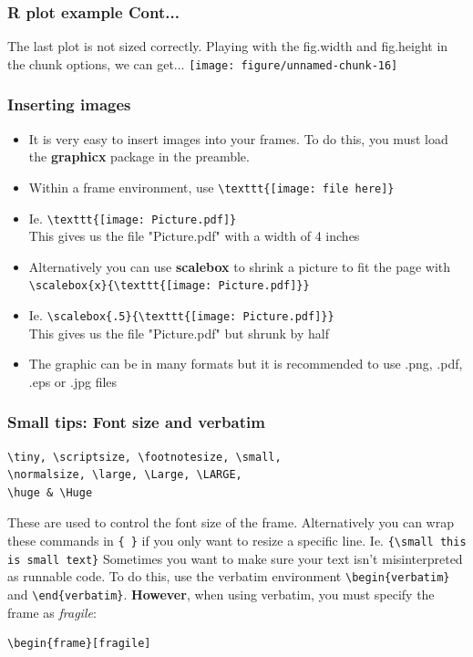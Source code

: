 \documentclass[nogin]{beamer}\usepackage[]{graphicx}\usepackage[]{color}
\newenvironment{knitrout}{}{} %
\begin{document}
\begin{frame}
\frametitle{R plot example Cont...}
The last plot is not sized correctly. Playing with the fig.width and fig.height in the chunk options, we can get...
\begin{knitrout}
\color{fgcolor}
\texttt{[image: figure/unnamed-chunk-16]} 

\end{knitrout}

\end{frame}

\begin{frame}[fragile]
\frametitle{Inserting images}
\scriptsize
\begin{itemize}
\item It is very easy to insert images into your frames. To do this, you must load the \textbf{graphicx} package in the preamble.
\item Within a frame environment, use \verb|\texttt{[image: file here]}|
\item Ie. \verb|\texttt{[image: Picture.pdf]}|\\
This gives us the file "Picture.pdf" with a width of 4 inches
\item Alternatively you can use \textbf{scalebox} to shrink a picture to fit the page with \verb|\scalebox{x}{\texttt{[image: Picture.pdf]}}|
\item Ie. \verb|\scalebox{.5}{\texttt{[image: Picture.pdf]}}|\\
This gives us the file "Picture.pdf" but shrunk by half
\item The graphic can be in many formats but it is recommended to use .png, .pdf, .eps or .jpg files
\end{itemize}
\end{frame}

\begin{frame}[fragile]
\frametitle{Small tips: Font size and verbatim}
\small
\begin{verbatim}
\tiny, \scriptsize, \footnotesize, \small,
\normalsize, \large, \Large, \LARGE,
\huge & \Huge
\end{verbatim}
These are used to control the font size of the frame. Alternatively you can wrap these commands in \verb|{ }| if you only want to resize a specific line.
Ie. \verb|{\small this is small text}|\vspace{\baselineskip}
\newline Sometimes you want to make sure your text isn't misinterpreted as runnable code. To do this, use the verbatim environment \verb|\begin{verbatim}| and \verb|\end{verbatim}|. \textbf{However}, when using verbatim, you must specify the frame as \emph{fragile}:
\begin{verbatim}
\begin{frame}[fragile]
\end{verbatim}
\end{frame}
\end{document}
